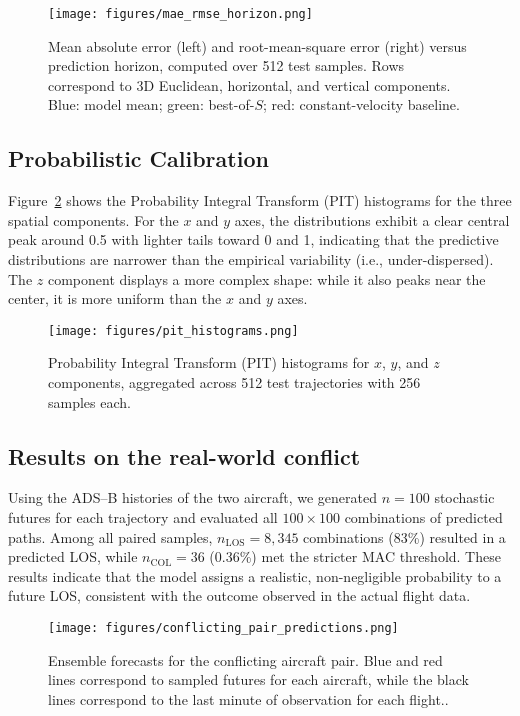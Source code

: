 \documentclass[
  manuscript=proceedings,  %
  layout=preprint,  %
  year=20xx,
  volume=x,
]{extra/joas}
\begin{document}
\begin{figure}[t]
\centering
\texttt{[image: figures/mae\_rmse\_horizon.png]}
\caption{Mean absolute error (left) and root-mean-square error (right) versus prediction horizon, computed over 512 test samples.
Rows correspond to 3D Euclidean, horizontal, and vertical components.
Blue: model mean; green: best-of-$S$; red: constant-velocity baseline.}
\label{fig:rmse_mae_curves}
\end{figure}

\subsection{Probabilistic Calibration}
\label{subsec:calibration}

Figure~\ref{fig:pit_hist} shows the Probability Integral Transform (PIT) histograms for the three spatial components.
For the $x$ and $y$ axes, the distributions exhibit a clear central peak around 0.5 with lighter tails toward 0 and 1, indicating that the predictive distributions are narrower than the empirical variability (i.e., under-dispersed).
The $z$ component displays a more complex shape: while it also peaks near the center, it is more uniform than the $x$ and $y$ axes.

\begin{figure}[hbt]
\centering
\texttt{[image: figures/pit\_histograms.png]}
\caption{Probability Integral Transform (PIT) histograms for $x$, $y$, and $z$ components, aggregated across 512 test trajectories with 256 samples each.}
\label{fig:pit_hist}
\end{figure}

\subsection{Results on the real-world conflict}

Using the ADS--B histories of the two aircraft, we generated $n=100$ stochastic futures for each trajectory and evaluated all $100\times100$ combinations of predicted paths.
Among all paired samples, \textbf{\(n_{\mathrm{LOS}} = 8,345\)} combinations (83\%) resulted in a predicted LOS, while \textbf{\(n_{\mathrm{COL}} = 36\)} (0.36\%) met the stricter MAC threshold.
These results indicate that the model assigns a realistic, non-negligible probability to a future LOS, consistent with the outcome observed in the actual flight data.
\begin{figure}[hbt]
\centering
\texttt{[image: figures/conflicting\_pair\_predictions.png]}
    \caption{Ensemble forecasts for the conflicting aircraft pair.
    Blue and red lines correspond to sampled futures for each aircraft, while the black lines correspond to the last minute of observation for each flight..}
    \label{fig:conflict_preds}
\end{figure}
\end{document}
